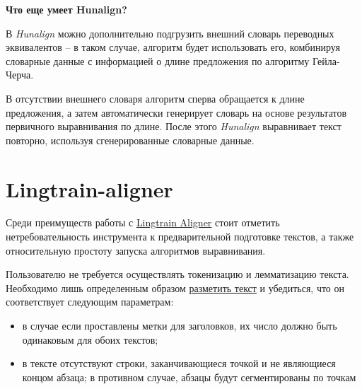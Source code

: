 \documentclass[
  letterpaper,
]{book}
\providecommand{\tightlist}{%
  \setlength{\itemsep}{0pt}\setlength{\parskip}{0pt}}\usepackage{longtable,booktabs,array}
\begin{document}
\begin{tcolorbox}[enhanced jigsaw, breakable, arc=.35mm, colframe=quarto-callout-note-color-frame, leftrule=.75mm, bottomrule=.15mm, rightrule=.15mm, toprule=.15mm, opacityback=0, left=2mm, colback=white]

\textbf{Что еще умеет Hunalign?}\vspace{2mm}

В \emph{Hunalign} можно дополнительно подгрузить внешний словарь
переводных эквивалентов -- в таком случае, алгоритм будет использовать
его, комбинируя словарные данные с информацией о длине предложения по
алгоритму Гейла-Черча.\footnotemark{}

В отсутствии внешнего словаря алгоритм сперва обращается к длине
предложения, а затем автоматически генерирует словарь на основе
результатов первичного выравнивания по длине. После этого
\emph{Hunalign} выравнивает текст повторно, используя сгенерированные
словарные данные.

\end{tcolorbox}


\hypertarget{sec-lingtrain}{%
\section{Lingtrain-aligner}\label{sec-lingtrain}}

Среди преимуществ работы с
\href{https://github.com/averkij/lingtrain-aligner}{Lingtrain Aligner}
стоит отметить нетребовательность инструмента к предварительной
подготовке текстов, а также относительную простоту запуска алгоритмов
выравнивания.

Пользователю не требуется осуществлять токенизацию и лемматизацию
текста. Необходимо лишь определенным образом
\href{https://habr.com/ru/articles/590549/}{разметить текст} и
убедиться, что он соответствует следующим параметрам:

\begin{itemize}
\tightlist
\item
  в случае если проставлены метки для заголовков, их число должно быть
  одинаковым для обоих текстов;
\item
  в тексте отсутствуют строки, заканчивающиеся точкой и не являющиеся
  концом абзаца; в противном случае, абзацы будут сегментированы по
  точкам
\end{itemize}
\end{document}
